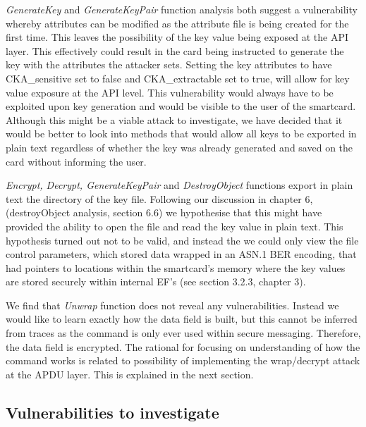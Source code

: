 \documentclass[bsc,frontabs,twoside,singlespacing,parskip,deptreport]{infthesis}     %
\begin{document}
\textit{GenerateKey} and \textit{GenerateKeyPair} function analysis both suggest a vulnerability whereby attributes can be modified as the attribute file is being created for the first time. This leaves the possibility of the key value being exposed at the API layer. This effectively could result in the card being instructed to generate the key with the attributes the attacker sets. Setting the key attributes to have CKA\_sensitive set to false and CKA\_extractable set to true, will allow for key value exposure at the API level. This vulnerability would always have to be exploited upon key generation and would be visible to the user of the smartcard. Although this might be a viable attack to investigate, we have decided that it would be better to look into methods that would allow all keys to be exported in plain text regardless of whether the key was already generated and saved on the card without informing the user.

\textit{Encrypt, Decrypt, GenerateKeyPair} and \textit{DestroyObject} functions export in plain text the directory of the key file. Following our discussion in chapter 6, (destroyObject analysis, section 6.6) we hypothesise that this might have provided the ability to open the file and read the key value in plain text. This hypothesis turned out not to be valid, and instead the  we could only view the file control parameters, which stored data wrapped in an ASN.1 BER encoding, that had pointers to locations within the smartcard's memory where the key values are stored securely within internal EF's (see section 3.2.3, chapter 3).

We find that \textit{Unwrap} function does not reveal any vulnerabilities. Instead we would like to learn exactly how the data field is built, but this cannot be inferred from traces as the command is only ever used within secure messaging. Therefore, the data field is encrypted. The rational for focusing on understanding of how the command works is related to possibility of implementing the wrap/decrypt attack at the APDU layer. This is explained in the next section.

\subsection{Vulnerabilities to investigate}
\end{document}
